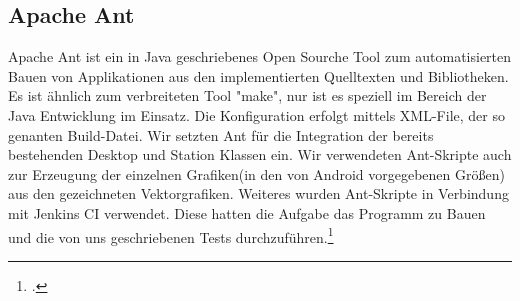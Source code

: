 
\subsection{Apache Ant}
Apache Ant ist ein in Java geschriebenes Open Sourche Tool zum automatisierten Bauen von Applikationen aus den implementierten Quelltexten und Bibliotheken. Es ist ähnlich zum verbreiteten Tool "make", nur ist es speziell im Bereich der Java Entwicklung im Einsatz. Die Konfiguration erfolgt mittels XML-File, der so genanten Build-Datei.
Wir setzten Ant für die Integration der bereits bestehenden Desktop und Station Klassen ein. Wir verwendeten Ant-Skripte auch zur Erzeugung der einzelnen Grafiken(in den von Android vorgegebenen Größen) aus den gezeichneten Vektorgrafiken.
Weiteres wurden Ant-Skripte in Verbindung mit Jenkins CI verwendet. Diese hatten die Aufgabe das Programm zu Bauen und die von uns geschriebenen Tests durchzuführen.\footcite[vgl.][]{ant}
